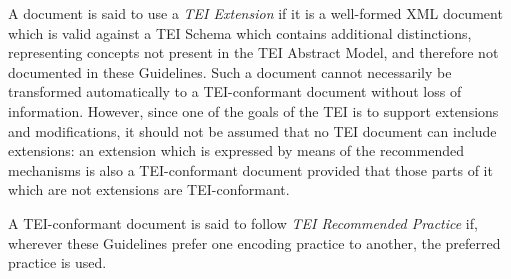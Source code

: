 A document is said to use a \textit{TEI Extension} if it is a well-formed XML document which is valid against a TEI Schema which contains additional distinctions, representing concepts not present in the TEI Abstract Model, and therefore not documented in these Guidelines. Such a document  cannot necessarily be transformed automatically to a TEI-conformant document without loss of information. However, since one of the goals of the TEI is to support extensions and modifications, it should not be assumed that no TEI document can include extensions: an extension which is expressed by means of the recommended mechanisms is also a TEI-conformant document provided that those parts of it which are not extensions are TEI-conformant.\par
A TEI-conformant document is said to follow \textit{TEI Recommended Practice} if, wherever these Guidelines prefer one encoding practice to another, the preferred practice is used.
